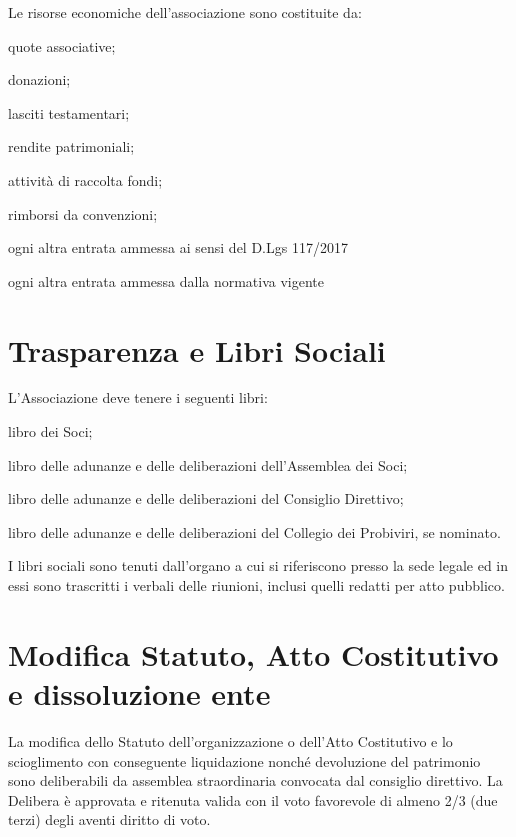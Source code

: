 \documentclass[legalpaper, 11pt]{exam}
\let\tempone\enumerate
\let\temptwo\endenumerate
\renewenvironment{enumerate}{\tempone\addtolength{\itemsep}{-0.45\baselineskip}}{\temptwo}
\begin{document}
\begin{enumerate}
 \item Le risorse economiche dell'associazione sono costituite da:
 \vspace{-5pt}
 \begin{enumerate}
  \item quote associative;
  \item donazioni;
  \item lasciti testamentari;
  \item rendite patrimoniali;
  \item attività di raccolta fondi;
  \item rimborsi da convenzioni;
  \item ogni altra entrata ammessa ai sensi del D.Lgs 117/2017
  \item ogni altra entrata ammessa dalla normativa vigente
 \end{enumerate}
\end{enumerate}


\section{Trasparenza e Libri Sociali}
\begin{enumerate}
 \item L'Associazione deve tenere i seguenti libri: 
 \vspace{-5pt}
 \begin{enumerate}
  \item libro dei Soci;
  \item libro delle adunanze e delle deliberazioni dell'Assemblea dei Soci;
  \item libro delle adunanze e delle deliberazioni del Consiglio Direttivo;
  \item libro delle adunanze e delle deliberazioni del Collegio dei Probiviri, se nominato.
 \end{enumerate}
 
 \item I libri sociali sono tenuti dall'organo a cui si riferiscono presso la sede legale ed in essi sono trascritti i verbali delle riunioni, inclusi quelli redatti per atto pubblico.
\end{enumerate}

\section{Modifica Statuto, Atto Costitutivo e dissoluzione ente}
\begin{enumerate}
\item La modifica dello Statuto dell’organizzazione o dell’Atto Costitutivo e lo scioglimento con conseguente liquidazione nonché devoluzione del patrimonio sono deliberabili da assemblea straordinaria convocata dal consiglio direttivo. La Delibera è approvata e ritenuta valida con il voto favorevole di almeno 2/3 (due terzi) degli aventi diritto di voto.
\end{enumerate}
\end{document}
